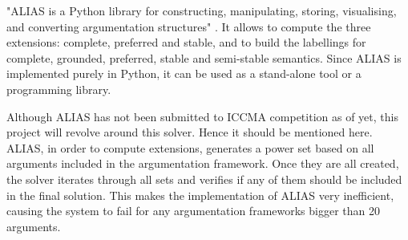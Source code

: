 "ALIAS is a Python library for constructing, manipulating, storing, visualising, and converting argumentation structures" \citep{alias}. It allows to compute the three extensions: complete, preferred and stable, and to build the labellings for complete, grounded, preferred, stable and semi-stable semantics. Since ALIAS is implemented purely in Python, it can be used as a stand-alone tool or a programming library. 

Although ALIAS has not been submitted to ICCMA competition as of yet, this project will revolve around this solver. Hence it should be mentioned here. ALIAS, in order to compute extensions, generates a power set based on all arguments included in the argumentation framework. Once they are all created, the solver iterates through all sets and verifies if any of them should be included in the final solution. This makes the implementation of ALIAS very inefficient, causing the system to fail for any argumentation frameworks bigger than 20 arguments. 

